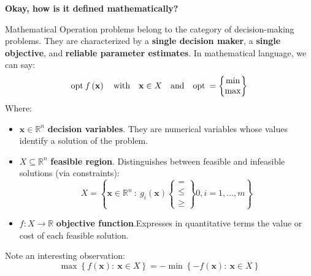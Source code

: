 \highspace
\begin{flushleft}
    \textcolor{Green3}{ \textbf{Okay, how is it defined mathematically?}}
\end{flushleft}
Mathematical Operation problems belong to the category of decision-making problems. They are characterized by a \textbf{single decision maker}, a \textbf{single objective}, and \textbf{reliable parameter estimates}. In mathematical language, we can say:
\begin{equation*}
    \mathrm{opt} \: f\left(\mathbf{x}\right) \hspace{1em} \text{with} \hspace{1em} \mathbf{x} \in X \hspace{1em} \text{and} \hspace{1em} \mathrm{opt} \: = \begin{Bmatrix}
        \min \\ \max
    \end{Bmatrix}
\end{equation*}
Where:
\begin{itemize}
    \item $\mathbf{x} \in \mathbb{R}^{n}$ \textbf{decision variables}. They are numerical variables whose values identify a solution of the problem.

    \item $X \subseteq \mathbb{R}^{n}$ \textbf{feasible region}. Distinguishes between feasible and infeasible solutions (via constraints):
    \begin{equation*}
        X = \left\{\mathbf{x} \in \mathbb{R}^{n} \: : \: g_{i}\left(\mathbf{x}\right) \begin{Bmatrix}
        = \\ \le \\ \ge
        \end{Bmatrix} 0, i = 1, \dots, m\right\}
    \end{equation*}

    \item $f: X \rightarrow \mathbb{R}$ \textbf{objective function}.Expresses in quantitative terms the value or cost of each feasible solution.
\end{itemize}
Note an interesting observation:
\begin{equation*}
    \max\left\{f\left(\mathbf{x}\right): \: \mathbf{x} \in X\right\} = -\min\left\{-f\left(\mathbf{x}\right): \: \mathbf{x} \in X\right\}
\end{equation*}

